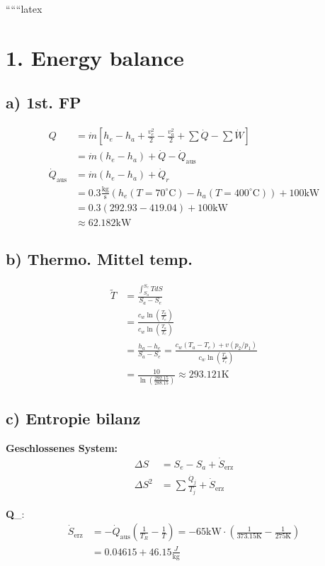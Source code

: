 
``````latex


\section*{1. Energy balance}

\subsection*{a) 1st. FP}
\begin{align*}
Q &= \dot{m} [h_e - h_a + \frac{v_e^2}{2} - \frac{v_a^2}{2} + \sum \dot{Q} - \sum \dot{W}] \\
&= \dot{m} (h_e - h_a) + \dot{Q} - \dot{Q}_{\text{aus}} \\
\dot{Q}_{\text{aus}} &= \dot{m} (h_e - h_a) + \dot{Q}_r \\
&= 0.3 \frac{\text{kg}}{\text{s}} (h_e (T = 70^\circ \text{C}) - h_a (T = 400^\circ \text{C})) + 100 \text{kW} \\
&= 0.3 (292.93 - 419.04) + 100 \text{kW} \\
&\approx 62.182 \text{kW}
\end{align*}

\subsection*{b) Thermo. Mittel temp.}
\begin{align*}
\tilde{T} &= \frac{\int_{S_a}^{S_e} T dS}{S_a - S_e} \\
&= \frac{c_w \ln \left( \frac{T_a}{T_e} \right)}{c_w \ln \left( \frac{T_a}{T_e} \right)} \\
&= \frac{h_a - h_e}{S_a - S_e} = \frac{c_w (T_a - T_e) + v (p_2 / p_1)}{c_w \ln \left( \frac{T_a}{T_e} \right)} \\
&= \frac{10}{\ln \left( \frac{292.15}{288.15} \right)} \approx 293.121 \text{K}
\end{align*}

\subsection*{c) Entropie bilanz}
\textbf{Geschlossenes System:}
\begin{align*}
\Delta S &= S_e - S_a + \dot{S}_{\text{erz}} \\
\Delta S^2 &= \sum \frac{\dot{Q}_j}{T_j} + \dot{S}_{\text{erz}}
\end{align*}

\textbf{Q}_{}:
\begin{align*}
\dot{S}_{\text{erz}} &= -\dot{Q}_{\text{aus}} \left( \frac{1}{T_R} - \frac{1}{T} \right) = -65 \text{kW} \cdot \left( \frac{1}{373.15 \text{K}} - \frac{1}{275 \text{K}} \right) \\
&= 0.04615 + 46.15 \frac{J}{\text{kg}}
\end{align*}

